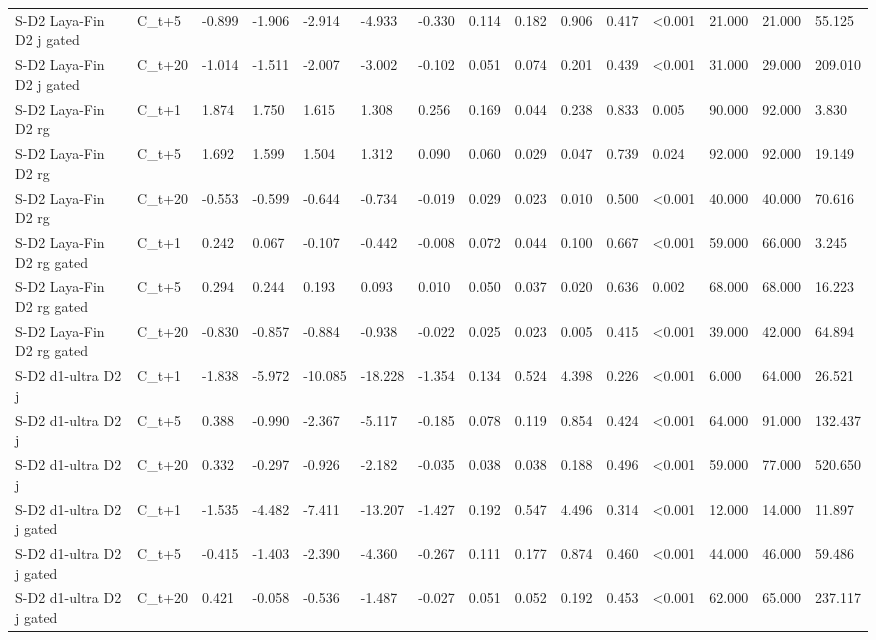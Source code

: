 \begin{tabular}{lllllllllllllll}
S-D2 Laya-Fin D2 j gated & C\_t+5 & -0.899 & -1.906 & -2.914 & -4.933 & -0.330 & 0.114 & 0.182 & 0.906 & 0.417 & <0.001 & 21.000 & 21.000 & 55.125 \\
S-D2 Laya-Fin D2 j gated & C\_t+20 & -1.014 & -1.511 & -2.007 & -3.002 & -0.102 & 0.051 & 0.074 & 0.201 & 0.439 & <0.001 & 31.000 & 29.000 & 209.010 \\
S-D2 Laya-Fin D2 rg & C\_t+1 & 1.874 & 1.750 & 1.615 & 1.308 & 0.256 & 0.169 & 0.044 & 0.238 & 0.833 & 0.005 & 90.000 & 92.000 & 3.830 \\
S-D2 Laya-Fin D2 rg & C\_t+5 & 1.692 & 1.599 & 1.504 & 1.312 & 0.090 & 0.060 & 0.029 & 0.047 & 0.739 & 0.024 & 92.000 & 92.000 & 19.149 \\
S-D2 Laya-Fin D2 rg & C\_t+20 & -0.553 & -0.599 & -0.644 & -0.734 & -0.019 & 0.029 & 0.023 & 0.010 & 0.500 & <0.001 & 40.000 & 40.000 & 70.616 \\
S-D2 Laya-Fin D2 rg gated & C\_t+1 & 0.242 & 0.067 & -0.107 & -0.442 & -0.008 & 0.072 & 0.044 & 0.100 & 0.667 & <0.001 & 59.000 & 66.000 & 3.245 \\
S-D2 Laya-Fin D2 rg gated & C\_t+5 & 0.294 & 0.244 & 0.193 & 0.093 & 0.010 & 0.050 & 0.037 & 0.020 & 0.636 & 0.002 & 68.000 & 68.000 & 16.223 \\
S-D2 Laya-Fin D2 rg gated & C\_t+20 & -0.830 & -0.857 & -0.884 & -0.938 & -0.022 & 0.025 & 0.023 & 0.005 & 0.415 & <0.001 & 39.000 & 42.000 & 64.894 \\
S-D2 d1-ultra D2 j & C\_t+1 & -1.838 & -5.972 & -10.085 & -18.228 & -1.354 & 0.134 & 0.524 & 4.398 & 0.226 & <0.001 & 6.000 & 64.000 & 26.521 \\
S-D2 d1-ultra D2 j & C\_t+5 & 0.388 & -0.990 & -2.367 & -5.117 & -0.185 & 0.078 & 0.119 & 0.854 & 0.424 & <0.001 & 64.000 & 91.000 & 132.437 \\
S-D2 d1-ultra D2 j & C\_t+20 & 0.332 & -0.297 & -0.926 & -2.182 & -0.035 & 0.038 & 0.038 & 0.188 & 0.496 & <0.001 & 59.000 & 77.000 & 520.650 \\
S-D2 d1-ultra D2 j gated & C\_t+1 & -1.535 & -4.482 & -7.411 & -13.207 & -1.427 & 0.192 & 0.547 & 4.496 & 0.314 & <0.001 & 12.000 & 14.000 & 11.897 \\
S-D2 d1-ultra D2 j gated & C\_t+5 & -0.415 & -1.403 & -2.390 & -4.360 & -0.267 & 0.111 & 0.177 & 0.874 & 0.460 & <0.001 & 44.000 & 46.000 & 59.486 \\
S-D2 d1-ultra D2 j gated & C\_t+20 & 0.421 & -0.058 & -0.536 & -1.487 & -0.027 & 0.051 & 0.052 & 0.192 & 0.453 & <0.001 & 62.000 & 65.000 & 237.117 \\

\end{tabular}
